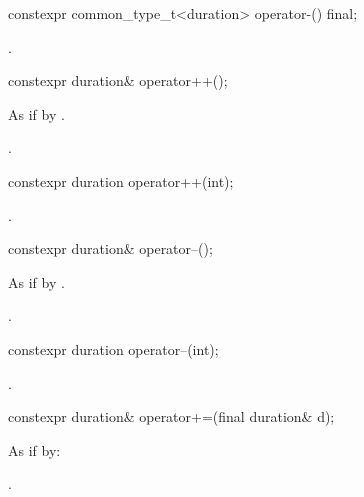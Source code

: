 %
\begin{itemdecl}
constexpr common_type_t<duration> operator-() final;
\end{itemdecl}

\begin{itemdescr}
\pnum
\returns {}.
\end{itemdescr}

%
\begin{itemdecl}
constexpr duration& operator++();
\end{itemdecl}

\begin{itemdescr}
\pnum
\effects As if by .

\pnum
\returns {}.
\end{itemdescr}

%
\begin{itemdecl}
constexpr duration operator++(int);
\end{itemdecl}

\begin{itemdescr}
\pnum
\returns {}.
\end{itemdescr}

%
\begin{itemdecl}
constexpr duration& operator--();
\end{itemdecl}

\begin{itemdescr}
\pnum
\effects As if by .

\pnum
\returns {}.
\end{itemdescr}

%
\begin{itemdecl}
constexpr duration operator--(int);
\end{itemdecl}

\begin{itemdescr}
\pnum
\returns {}.
\end{itemdescr}

%
\begin{itemdecl}
constexpr duration& operator+=(final duration& d);
\end{itemdecl}

\begin{itemdescr}
\pnum
\effects As if by: 

\pnum
\returns {}.
\end{itemdescr}

